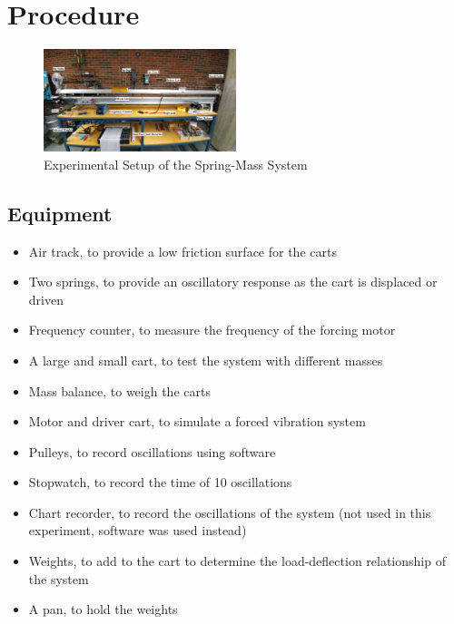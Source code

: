 \section{Procedure}
\begin{figure}[h]
    \centering
    \includegraphics[width=0.5\textwidth]{Sections/Figures/experimental setup.jpg}
    \caption{Experimental Setup of the Spring-Mass System}
\end{figure}
\subsection{Equipment}
\begin{itemize}
    \item Air track, to provide a low friction surface for the carts
    \item Two springs, to provide an oscillatory response as the cart is displaced or driven
    \item Frequency counter, to measure the frequency of the forcing motor
    \item A large and small cart, to test the system with different masses
    \item Mass balance, to weigh the carts
    \item Motor and driver cart, to simulate a forced vibration system
    \item Pulleys, to record oscillations using software
    \item Stopwatch, to record the time of 10 oscillations
    \item Chart recorder, to record the oscillations of the system (not used in this experiment, software was used instead)
    \item Weights, to add to the cart to determine the load-deflection relationship of the system
    \item A pan, to hold the weights
\end{itemize}


